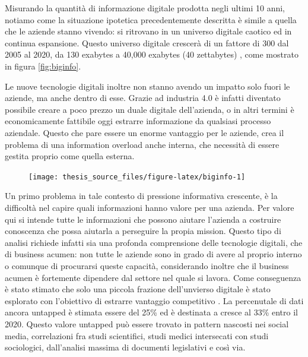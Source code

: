 \documentclass[]{book}
\begin{document}
Misurando la quantità di informazione digitale prodotta negli ultimi 10
anni, notiamo come la situazione ipotetica precedentemente descritta è
simile a quella che le aziende stanno vivendo: si ritrovano in un
universo digitale caotico ed in continua espansione. Questo universo
digitale crescerà di un fattore di 300 dal 2005 al 2020, da 130 exabytes
a 40,000 exabytes (40 zettabytes) \citep{gantz2012digital}, come
mostrato in figura \ref{fig:biginfo}.

Le nuove tecnologie digitali inoltre non stanno avendo un impatto solo
fuori le aziende, ma anche dentro di esse. Grazie ad industria 4.0 è
infatti diventato possibile creare a poco prezzo un duale digitale
dell'azienda, o in altri termini è economicamente fattibile oggi
estrarre informazione da qualsiasi processo aziendale. Questo che pare
essere un enorme vantaggio per le aziende, crea il problema di una
information overload anche interna, che necessità di essere gestita
proprio come quella esterna.

\begin{figure}

{\centering \texttt{[image: thesis\_source\_files/figure-latex/biginfo-1]} 

}

\end{figure}

Un primo problema in tale contesto di pressione informativa crescente, è
la difficoltà nel capire quali informazioni hanno valore per una
azienda. Per valore qui si intende tutte le informazioni che possono
aiutare l'azienda a costruire conoscenza che possa aiutarla a perseguire
la propia mission. Questo tipo di analisi richiede infatti sia una
profonda comprensione delle tecnologie digitali, che di business acumen:
non tutte le aziende sono in grado di avere al proprio interno o
comunque di procurarsi queste capacità, considerando inoltre che il
business acumen è fortemente dipendere dal settore nel quale si lavora.
Come conseguenza è stato stimato che solo una piccola frazione
dell'unvierso digitale è stato esplorato con l'obiettivo di estrarre
vantaggio competitivo \citep{data2012bigger}. La percenutale di dati
ancora untapped è stimata essere del 25\% ed è destinata a cresce al
33\% entro il 2020. Questo valore untapped può essere trovato in pattern
nascosti nei social media, correlazioni fra studi scientifici, studi
medici intersecati con studi sociologici, dall'analisi massima di
documenti legislativi e così via.
\end{document}
